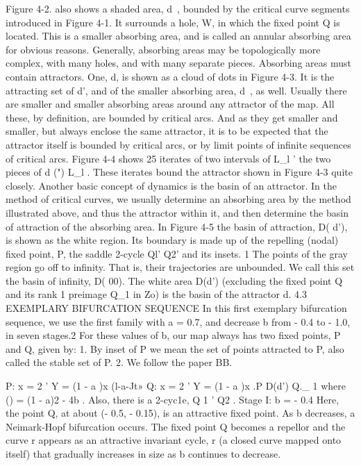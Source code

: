 \documentclass{article}
\begin{document}
Figure 4-2. also shows a shaded area, d~, bounded by the critical
curve segments introduced in Figure 4-1. It surrounds a hole, W,
in which the fixed point Q is located. This is a smaller absorbing
area, and is called an annular absorbing area for obvious reasons.
Generally, absorbing areas may be topologically more complex,
with many holes, and with many separate pieces.
Absorbing areas must contain attractors. One, d, is shown as a
cloud of dots in Figure 4-3. It is the attracting set of d', and of the
smaller absorbing area, d~, as well.
Usually there are smaller and smaller absorbing areas around
any attractor of the map. All these, by definition, are bounded by
critical arcs. And as they get smaller and smaller, but always
enclose the same attractor, it is to be expected that the attractor
itself is bounded by critical arcs, or by limit points of infinite
sequences of critical arcs. Figure 4-4 shows 25 iterates of two intervals
of L_l ' the two pieces of d (") L_l . These iterates bound the
attractor shown in Figure 4-3 quite closely.
Another basic concept of dynamics is the basin of an attractor.
In the method of critical curves, we usually determine an absorbing
area by the method illustrated above, and thus the attractor within it,
and then determine the basin of attraction of the absorbing area. In
Figure 4-5 the basin of attraction, D( d'), is shown as the white
region. Its boundary is made up of the repelling (nodal) fixed point,
P, the saddle 2-cycle {Ql' Q2}' and its insets. 1 The points of the
gray region go off to infinity. That is, their trajectories are
unbounded. We call this set the basin of infinity, D( 00). The white
area D(d') (excluding the fixed point Q and its rank 1 preimage
Q_1 in Zo) is the basin of the attractor d.
4.3 EXEMPLARY BIFURCATION SEQUENCE
In this first exemplary bifurcation sequence, we use the first
family with a = 0.7, and decrease b from - 0.4 to - 1.0, in seven
stages.2 For these values of b, our map always has two fixed points,
P and Q, given by:
1. By inset of P we mean the set of points attracted to P, also called the stable set of P.
2. We follow the paper BB.

P: x = 2 ' Y = (1 - a )x
(l-a-Jt»
Q: x = 2 ' Y = (1 - a )x
.P
D(d')
Q._ 1
where () = (1 - a)2 - 4b . Also, there is a 2-cyc1e, {Q 1 ' Q2 }.
Stage I: b = - 0.4
Here, the point Q, at about (- 0.5, - 0.15), is an attractive fixed
point. As b decreases, a Neimark-Hopf bifurcation occurs. The
fixed point Q becomes a repellor and the curve r appears as an
attractive invariant cycle, r (a closed curve mapped onto itself) that
gradually increases in size as b continues to decrease.
\end{document}

